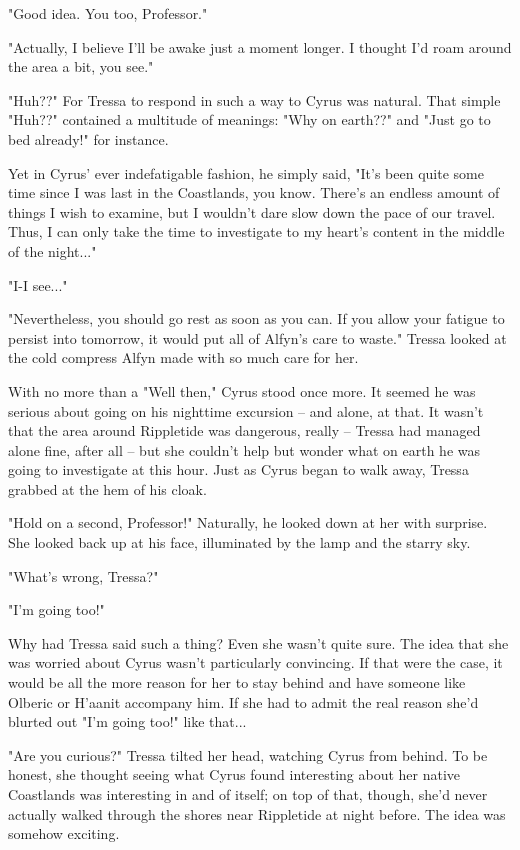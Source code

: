 "Good idea. You too, Professor."

"Actually, I believe I'll be awake just a moment longer. I thought I'd roam around the area a bit, you see."

"Huh??" For Tressa to respond in such a way to Cyrus was natural. That simple "Huh??" contained a multitude of meanings: "Why on earth??" and "Just go to bed already!" for instance. 

Yet in Cyrus' ever indefatigable fashion, he simply said, "It's been quite some time since I was last in the Coastlands, you know. There's an endless amount of things I wish to examine, but I wouldn't dare slow down the pace of our travel. Thus, I can only take the time to investigate to my heart's content in the middle of the night..."

"I-I see..."

"Nevertheless, you should go rest as soon as you can. If you allow your fatigue to persist into tomorrow, it would put all of Alfyn's care to waste." Tressa looked at the cold compress Alfyn made with so much care for her.

With no more than a "Well then," Cyrus stood once more. It seemed he was serious about going on his nighttime excursion -- and alone, at that. It wasn't that the area around Rippletide was dangerous, really -- Tressa had managed alone fine, after all -- but she couldn't help but wonder what on earth he was going to investigate at this hour. Just as Cyrus began to walk away, Tressa grabbed at the hem of his cloak.

"Hold on a second, Professor!" Naturally, he looked down at her with surprise. She looked back up at his face, illuminated by the lamp and the starry sky.

"What's wrong, Tressa?"

"I'm going too!"
\newline

Why had Tressa said such a thing? Even she wasn't quite sure. The idea that she was worried about Cyrus wasn't particularly convincing. If that were the case, it would be all the more reason for her to stay behind and have someone like Olberic or H'aanit accompany him. If she had to admit the real reason she'd blurted out "I'm going too!" like that...

"Are you curious?" Tressa tilted her head, watching Cyrus from behind. To be honest, she thought seeing what Cyrus found interesting about her native Coastlands was interesting in and of itself; on top of that, though, she'd never actually walked through the shores near Rippletide at night before. The idea was somehow exciting.


